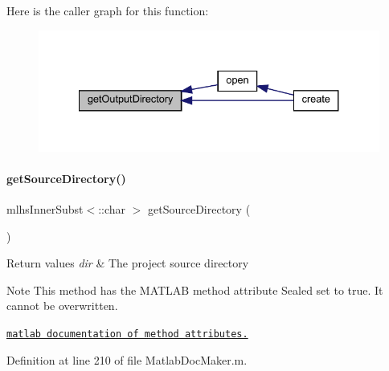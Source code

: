 Here is the caller graph for this function\+:\nopagebreak
\begin{figure}[H]
\begin{center}
\leavevmode
\includegraphics[width=334pt]{class_matlab_doc_maker_a8a464e2b3bd76625f637dedbedbd1ea0_icgraph}
\end{center}
\end{figure}
\mbox{\label{class_matlab_doc_maker_a70806462467982623dd808caef7b6b03}} 
\paragraph{\texorpdfstring{get\+Source\+Directory()}{getSourceDirectory()}}
{\footnotesize\ttfamily mlhs\+Inner\+Subst$<$\+::char $>$ get\+Source\+Directory (\begin{DoxyParamCaption}{ }\end{DoxyParamCaption})\hspace{0.3cm}{\ttfamily [static]}}


\begin{DoxyRetVals}{Return values}
{\em dir} & The project source directory\\
\hline
\end{DoxyRetVals}
\begin{DoxyNote}{Note}
This method has the M\+A\+T\+L\+AB method attribute {\ttfamily Sealed} set to true. It cannot be overwritten. 

\href{http://www.mathworks.com/help/matlab/matlab_oop/method-attributes.html}{\tt matlab documentation of method attributes.} 
\end{DoxyNote}


Definition at line 210 of file Matlab\+Doc\+Maker.\+m.

